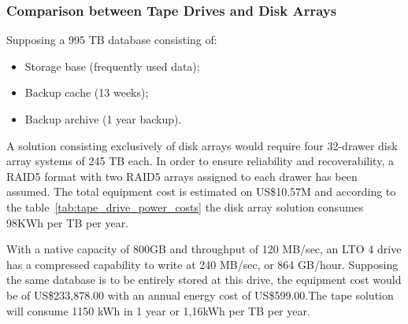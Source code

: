             \subsubsection*{Comparison between Tape Drives and Disk Arrays}
                Supposing a 995 TB database consisting of:
                \begin{itemize}
                	\item Storage base (frequently used data);
                	\item Backup cache (13 weeks);
                	\item Backup archive (1 year backup).
                \end{itemize}
                A solution consisting exclusively of disk arrays would require four 32-drawer disk array systems of 245 TB each. In order to ensure reliability and recoverability, a RAID5 format with two RAID5 arrays assigned to each drawer has been assumed. The total equipment cost is estimated on US\$10.57M \cite{Reine08} and according to the table~\ref{tab:tape_drive_power_costs} the disk array solution consumes 98KWh per TB per year.
                \begin{table}[h!tb]
                \centering 
                \label{tab:tape_drive_power_costs} %
                \end{table}
                With a native capacity of 800GB and throughput of 120 MB/sec, an LTO 4 drive has a compressed capability to write at 240 MB/sec, or 864 GB/hour. Supposing the same database is to be entirely stored at this drive, the equipment cost would be of US\$233,878.00 with an annual energy cost of US\$599.00.The tape solution will consume 1150 kWh in 1 year or 1,16kWh per TB per year.
